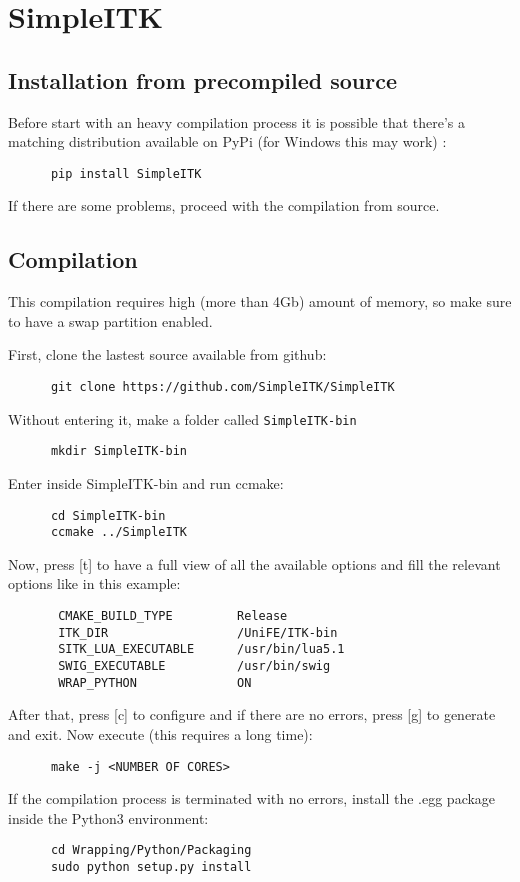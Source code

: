 \documentclass[a4paper,11pt, oneside]{article}
\begin{document}
    
    
    \section{ SimpleITK }
    \subsection{ Installation from precompiled source }
    Before start with an heavy compilation process it is possible that there's a matching distribution available on PyPi (for Windows this may work) :
    \begin{lstlisting}
      pip install SimpleITK
    \end{lstlisting}
    If there are some problems, proceed with the compilation from source.
    \subsection{ Compilation }
    This compilation requires high (more than 4Gb) amount of memory, so make sure to have a swap partition enabled. 
    \par First, clone the lastest source available from github:
    \begin{lstlisting}
      git clone https://github.com/SimpleITK/SimpleITK
    \end{lstlisting}
    Without entering it, make a folder called \texttt{SimpleITK-bin}\newline
    \begin{lstlisting}
      mkdir SimpleITK-bin
    \end{lstlisting}
    Enter inside SimpleITK-bin and run ccmake:
    \begin{lstlisting}
      cd SimpleITK-bin
      ccmake ../SimpleITK
    \end{lstlisting}
    Now, press [t] to have a full view of all the available options and fill the relevant options like in this example:
    \begin{lstlisting}
       CMAKE_BUILD_TYPE         Release
       ITK_DIR                  /UniFE/ITK-bin
       SITK_LUA_EXECUTABLE      /usr/bin/lua5.1
       SWIG_EXECUTABLE          /usr/bin/swig
       WRAP_PYTHON              ON
    \end{lstlisting}
    
    After that, press [c] to configure and if there are no errors, press [g] to generate and exit.
    Now execute (this requires a long time):
    \begin{lstlisting}
      make -j <NUMBER OF CORES>
    \end{lstlisting}
    If the compilation process is terminated with no errors, install the .egg package inside the Python3 environment:
    \begin{lstlisting}
      cd Wrapping/Python/Packaging
      sudo python setup.py install
    \end{lstlisting}
    
\end{document}
